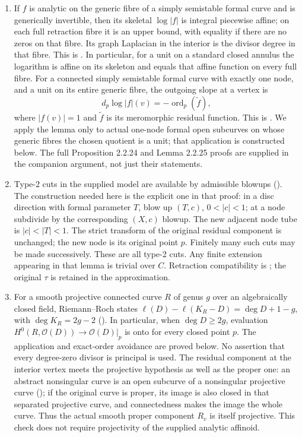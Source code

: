 \documentclass[11pt]{article}
\newcommand{\ord}{\operatorname{ord}}
\begin{document}
\begin{enumerate}
\item If $f$ is analytic on the generic fibre of a simply semistable
formal curve and is generically invertible, then its skeletal
$\log|f|$ is integral piecewise affine; on each full retraction fibre
it is an upper bound, with equality if there are no zeros on that
fibre. Its graph Laplacian in the interior is the divisor degree in
that fibre. This is \cite[Proposition 2.2.24]{Thu}. In particular,
for a unit on a standard closed annulus the logarithm is affine on
its skeleton and equals that affine function on every full fibre.
For a connected simply semistable formal curve with exactly one node,
and a unit on its entire generic fibre, the outgoing slope at a
vertex is
\[
                 d_p\log|f|(v)=-\ord_p(\widetilde f),
\]
where $|f(v)|=1$ and $\widetilde f$ is its meromorphic residual
function. This is \cite[Lemma 2.2.25]{Thu}. We apply the lemma only
to actual one-node formal open subcurves on whose generic fibres
the chosen quotient is a unit; that application is constructed below.
The full Proposition 2.2.24 and Lemma 2.2.25 proofs are supplied in
the companion argument, not just their statements.

\item Type-2 cuts in the supplied model are available by admissible
blowups (\cite[Lemma 2.2.22]{Thu}). The construction needed here is
the explicit one in that proof: in a disc direction with formal
parameter $T$, blow up $(T,c)$, $0<|c|<1$; at a node subdivide by
the corresponding $(X,c)$ blowup. The new adjacent node tube is
$|c|<|T|<1$. The strict transform of the original residual component
is unchanged; the new node is its original point $p$. Finitely many
such cuts may be made successively. These are all type-2 cuts.
Any finite extension appearing in that lemma is trivial over $C$.
Retraction compatibility is \cite[Proposition 2.2.26]{Thu}; the
original $\tau$ is retained in the approximation.

\item For a smooth projective connected curve $R$ of genus $g$ over an
algebraically closed field, Riemann--Roch states
$\ell(D)-\ell(K_R-D)=\deg D+1-g$, with $\deg K_R=2g-2$
(\cite[IV, Theorem 1.3 and Corollary 1.4]{Hart}). In particular,
when $\deg D\geq2g$, evaluation
$H^0(R,\mathcal O(D))\to\mathcal O(D)|_p$ is onto for every closed
point $p$. The application and exact-order avoidance are proved below.
No assertion that every degree-zero divisor is principal is used.
The residual component at the interior vertex meets the projective
hypothesis as well as the proper one: an abstract nonsingular curve
is an open subcurve of a nonsingular projective curve
(\cite[I, Theorem 6.9]{Hart}); if the original curve is proper,
its image is also closed in that separated projective curve, and
connectedness makes the image the whole curve. Thus the actual
smooth proper component $R_v$ is itself projective. This check
does not require projectivity of the supplied analytic affinoid.


\end{enumerate}
\end{document}
